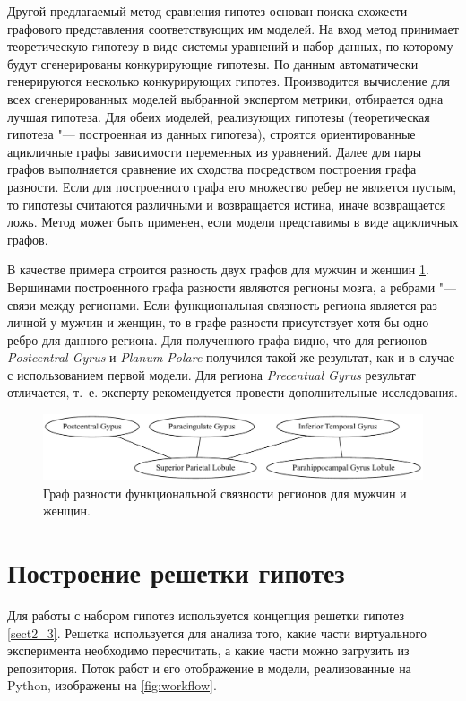 Другой предлагаемый метод сравнения гипотез основан поиска схожести графового представления соответствующих 
им моделей. На вход метод принимает теоретическую гипотезу в виде системы уравнений и набор данных, 
по которому будут сгенерированы конкурирующие гипотезы. По данным автоматически генерируются несколько 
конкурирующих гипотез. Производится вычисление для всех сгенерированных моделей выбранной экспертом 
метрики, отбирается одна лучшая гипотеза. Для обеих моделей, реализующих гипотезы 
(теоретическая гипотеза "--- построенная из данных гипотеза), строятся ориентированные ацикличные 
графы зависимости переменных из уравнений. Далее для пары графов выполняется сравнение их сходства 
посредством построения графа разности. Если для построенного графа его множество ребер не является 
пустым, то гипотезы считаются различными и возвращается истина, иначе возвращается ложь. 
Метод может быть применен, если модели представимы в виде ацикличных графов.

В качестве примера строится разность двух графов для мужчин и женщин \cref{fig:graph_difference}. 
Вершинами построенного графа разности являются регионы мозга, а ребрами "--- связи между регионами. Если 
функциональная связность региона является раз-личной у мужчин и женщин, то в графе разности 
присутствует хотя бы одно ребро для данного региона. Для полученного графа видно, что для регионов 
\textit{Postcentral Gyrus} и \textit{Planum Polare} получился такой же результат, как и в случае с 
использованием первой модели. Для региона \textit{Precentual Gyrus} результат отличается, 
т.~е. эксперту рекомендуется провести дополнительные исследования.


\begin{figure}[ht]
    \centering
    \includegraphics[width=1.0\linewidth]{images/graph_difference.pdf}
    \caption{Граф разности функциональной связности регионов для мужчин и женщин.}\label{fig:graph_difference}
\end{figure}

\section{Построение решетки гипотез}\label{sect_5_3}
Для работы с набором гипотез используется концепция решетки гипотез \cref{sect2_3}. Решетка используется 
для анализа того, какие части виртуального эксперимента необходимо пересчитать, а какие части можно 
загрузить из репозитория. Поток работ и его отображение в модели, реализованные на Python, 
изображены на \cref{fig:workflow}.

